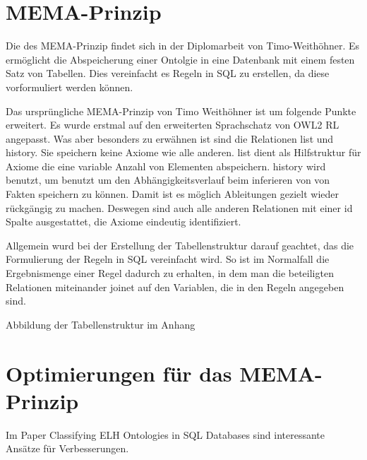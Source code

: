 \section{MEMA-Prinzip}
Die des MEMA-Prinzip findet sich in der Diplomarbeit von Timo-Weithöhner. Es ermöglicht die Abspeicherung einer Ontolgie in eine Datenbank mit einem festen Satz von Tabellen. Dies vereinfacht es Regeln in SQL zu erstellen, da diese vorformuliert werden können.

Das ursprüngliche MEMA-Prinzip von Timo Weithöhner ist um folgende Punkte erweitert.
Es wurde erstmal auf den erweiterten Sprachschatz von OWL2 RL angepasst. Was aber besonders zu erwähnen ist sind die Relationen list und history. Sie speichern keine Axiome wie alle anderen. list dient als Hilfstruktur für Axiome die eine variable Anzahl von Elementen abspeichern. history wird benutzt, um benutzt um den Abhängigkeitsverlauf beim inferieren von von Fakten speichern zu können. Damit ist es möglich Ableitungen gezielt wieder rückgängig zu machen. Deswegen sind auch alle anderen Relationen mit einer id Spalte ausgestattet, die Axiome eindeutig identifiziert.

Allgemein wurd bei der Erstellung der Tabellenstruktur darauf geachtet, das die Formulierung der Regeln in SQL vereinfacht wird. So ist im Normalfall die Ergebnismenge einer Regel dadurch zu erhalten, in dem man die beteiligten Relationen miteinander joinet auf den Variablen, die in den Regeln angegeben sind.

Abbildung der Tabellenstruktur im Anhang


\section{Optimierungen für das MEMA-Prinzip}

Im Paper Classifying ELH Ontologies in SQL Databases sind interessante Ansätze für Verbesserungen.


